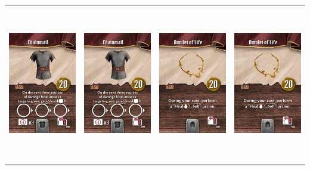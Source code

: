 \documentclass{minimal}
\begin{document}
{\begin{longtable}{llll}
\includegraphics[width=44mm,height=68mm]{./22-28/gh-023-chainmail.png} &
\includegraphics[width=44mm,height=68mm]{./22-28/gh-023-chainmail.png} &
\includegraphics[width=44mm,height=68mm]{./22-28/gh-024-amulet-of-life.png} &
\includegraphics[width=44mm,height=68mm]{./22-28/gh-024-amulet-of-life.png}\\ 

\end{longtable}}
\end{document}

